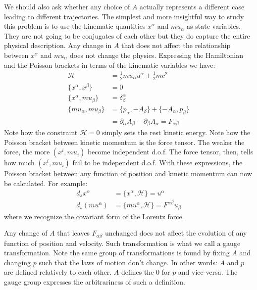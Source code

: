 \documentclass[smallextended]{svjour3}
\numberwithin{equation}{section}
\theoremstyle{definition}
\begin{document}
We should also ask whether any choice of $A$ actually represents a different case leading to different trajectories. The simplest and more insightful way to study this problem is to use the kinematic quantities $x^\alpha$ and $mu_\alpha$ as state variables. They are not going to be conjugates of each other but they do capture the entire physical description. Any change in $A$ that does not affect the relationship between $x^\alpha$ and $mu_\alpha$ does not change the physics. Expressing the Hamiltonian and the Poisson brackets in terms of the kinematic variables we have:
\begin{align*}
\mathcal{H}&=\frac{1}{2}mu_\alpha u^\alpha + \frac{1}{2} m c^2 \\
\{x^\alpha, x^\beta\} &= 0 \\
\{x^\alpha, mu_\beta\} &= \delta^\alpha_\beta \\
\{mu_\alpha, mu_\beta\} &= \{p_\alpha, - A_\beta\} + \{-A_\alpha, p_\beta\} \\
&= \partial_\alpha A_\beta - \partial_\beta A_\alpha = F_{\alpha\beta}
\end{align*}
Note how the constraint $\mathcal{H}=0$ simply sets the rest kinetic energy. Note how the Poisson bracket between kinetic momentum is the force tensor. The weaker the force, the more $(x^i, mu_i)$ become independent d.o.f. The force tensor, then, tells how much $(x^i, mu_i)$ fail to be independent d.o.f. With these expressions, the Poisson bracket between any function of position and kinetic momentum can now be calculated. For example:
\begin{align*}
d_s x^\alpha &= \{x^\alpha, \mathcal{H}\} = u^\alpha \\
d_s (mu^\alpha) &= \{mu^\alpha, \mathcal{H}\} = F^{\alpha\beta} u_\beta
\end{align*}
where we recognize the covariant form of the Lorentz force.

Any change of $A$ that leaves $F_{\alpha\beta}$ unchanged does not affect the evolution of any function of position and velocity. Such transformation is what we call a gauge transformation. Note the same group of transformations is found by fixing $A$ and changing $p$ such that the laws of motion don't change. In other words: $A$ and $p$ are defined relatively to each other. $A$ defines the $0$ for $p$ and vice-versa. The gauge group expresses the arbitrariness of such a definition.
\end{document}
